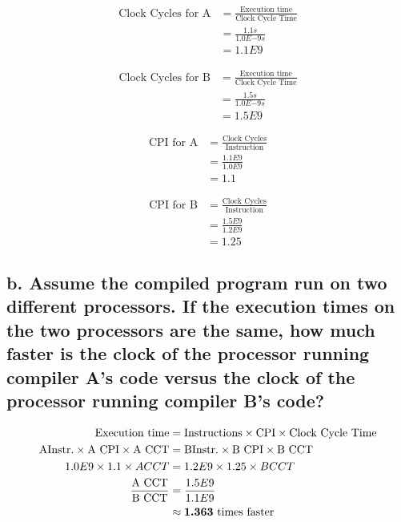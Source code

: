 \documentclass[11pt]{article}
\begin{document}
\begin{align*}
\textrm{Clock Cycles for A} & = \frac{\textrm{Execution time}}{\textrm{Clock Cycle Time}} \\
& = \frac{1.1s}{1.0E{-9}s}\\
& = 1.1E9
\end{align*}

\begin{align*}
\textrm{Clock Cycles for B} & = \frac{\textrm{Execution time}}{\textrm{Clock Cycle Time}} \\
& = \frac{1.5s}{1.0E{-9}s}\\
& = 1.5E9
\end{align*}

\begin{align*}
\textrm{CPI for A} & = \frac{\textrm{Clock Cycles}}{\textrm{Instruction}} \\
& = \frac{1.1E9}{1.0E9}\\
& = \boldsymbol{1.1}
\end{align*}

\begin{align*}
\textrm{CPI for B} & = \frac{\textrm{Clock Cycles}}{\textrm{Instruction}} \\
& = \frac{1.5E9}{1.2E9}\\
& = \boldsymbol{1.25}
\end{align*}

\subsection*{\small b. Assume the compiled program run on two different processors. If the execution times on the two processors are the same, how much faster is the clock of the processor running compiler A's code versus the clock of the processor running compiler B's code?}

\begin{align*}
\textrm{Execution time} & = \textrm{Instructions} \times \textrm{CPI} \times \textmd{Clock Cycle Time}\\
\textrm{AInstr.} \times \textrm{A CPI} \times \textmd{A CCT} & =  \textrm{BInstr.} \times \textrm{B CPI} \times \textmd{B CCT}\\
1.0E9 \times 1.1 \times A CCT & = 1.2E9 \times 1.25 \times B CCT\\
\frac{\textrm{A CCT}}{\textrm{B CCT}} & = \frac{1.5E9}{1.1E9}\\
& \approx \boldsymbol{1.363 \textrm{ times faster}}
\end{align*}
\end{document}

